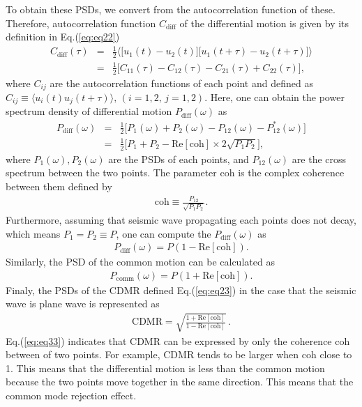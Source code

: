 To obtain these PSDs, we convert from the autocorrelation function of these. Therefore, autocorrelation function $C_{\mathrm{diff}}$ of the differential motion is given by its definition in Eq.(\ref{eq:eq22})
\begin{eqnarray}
  C_{\mathrm{diff}}(\tau) &=& \frac{1}{2}
  \biggl\langle
  \biggl[ u_{1}(t)-u_{2}(t) \biggr] \biggl[ u_{1}(t+\tau)-u_{2}(t+\tau) \biggr]
  \biggr\rangle \\
  &=& \frac{1}{2}\biggl[ C_{11}(\tau) - C_{12}(\tau) - C_{21}(\tau) + C_{22}(\tau) \biggr], 
\end{eqnarray}
where $C_{ij}$ are the autocorrelation functions of each point and defined as $ C_{ij} \equiv \langle u_{i}(t)u_{j}(t+\tau)\rangle,\, (i=1,2,\,j=1,2)$. Here, one can obtain the power spectrum density of differential motion $P_{\mathrm{diff}}(\omega)$ as 
\begin{eqnarray}
  P_{\mathrm{diff}}(\omega) &=& \frac{1}{2}\biggl[ P_{1}(\omega) + P_{2}(\omega) - P_{12}(\omega) - P_{12}^*(\omega) \biggr]\\
  &=& \frac{1}{2} \biggl[ P_{1}+P_{2} - \mathrm{Re}\left[\mathrm{coh} \right]\times2\sqrt{P_{1}P_{2}} \biggr], \label{eq:eq31}
\end{eqnarray}
where $P_{1}(\omega),P_{2}(\omega)$ are the PSDs of each points, and $P_{12}(\omega)$ are the cross spectrum between the two points. The parameter $\mathrm{coh}$ is the complex coherence between them defined by
\begin{eqnarray}
  \mathrm{coh} \equiv \frac{P_{12}}{\sqrt{P_{1}P_{2}}}.
\end{eqnarray}
Furthermore, assuming that seismic wave propagating each points does not decay, which means $P_{1}=P_{2} \equiv P$, one can compute the $P_{\mathrm{diff}}(\omega)$ as 
\begin{eqnarray} \label{eq:eq32}
  P_{\mathrm{diff}}(\omega) = P (1-\mathrm{Re}\left[\mathrm{coh}\right]).
\end{eqnarray}
Similarly, the PSD of the common motion can be calculated as
\begin{eqnarray}
  P_{\mathrm{comm}}(\omega) = P (1+\mathrm{Re}\left[\mathrm{coh}\right]).
\end{eqnarray}
Finaly, the PSDs of the CDMR defined Eq.(\ref{eq:eq23}) in the case that the seismic wave is plane wave is represented as
\begin{eqnarray}
 \mathrm{CDMR} = \sqrt{\frac{1 + \mathrm{Re} \left[\mathrm{coh} \right] }{1 - \mathrm{Re} \left[\mathrm{coh} \right]}}\,. \label{eq:eq33}
\end{eqnarray}
Eq.(\ref{eq:eq33}) indicates that CDMR can be expressed by only the coherence $\mathrm{coh}$ between of two points. For example, CDMR tends to be larger when $\mathrm{coh}$ close to 1. This means that the differential motion is less than the common motion because the two points move together in the same direction. This means that the common mode rejection effect.

